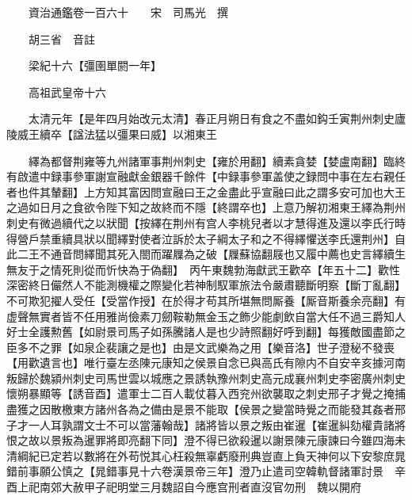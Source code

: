 










 


 
 


 

  
  
  
  
  





  
  
  
  
  
 
  

  

  
  
  



  

 
 

  
   




  

  
  


  　　資治通鑑卷一百六十　　宋　司馬光　撰

　　胡三省　音註

　　梁紀十六【彊圉單閼一年】

　　高祖武皇帝十六

　　太清元年【是年四月始改元太清】春正月朔日有食之不盡如鈎壬寅荆州刺史廬陵威王續卒【諡法猛以彊果曰威】以湘東王

　　繹為都督荆雍等九州諸軍事荆州刺史【雍於用翻】續素貪婪【婪盧南翻】臨終有啟遣中録事參軍謝宣融獻金銀器千餘件【中録事參軍盖使之録問中事在左右親任者也件其輦翻】上方知其富因問宣融曰王之金盡此乎宣融曰此之謂多安可加也大王之過如日月之食欲令陛下知之故終而不隱【終謂卒也】上意乃解初湘東王繹為荆州刺史有微過續代之以狀聞【按繹在荆州有宫人李桃兒者以才慧得進及還以李氏行時得營戶禁重續具狀以聞繹對使者泣訴於太子綱太子和之不得繹懼送李氏還荆州】自此二王不通音問繹聞其死入閤而躍屧為之破【屧蘇協翻屐也又履中薦也史言繹續生無友于之情死則從而忻快為于偽翻】　丙午東魏勃海獻武王歡卒【年五十二】歡性深密終日儼然人不能測機權之際變化若神制馭軍旅法令嚴肅聽斷明察【斷丁亂翻】不可欺犯擢人受任【受當作授】在於得才苟其所堪無問厮養【厮音斯養余亮翻】有虚聲無實者皆不任用雅尚儉素刀劒鞍勒無金玉之飾少能劇飲自當大任不過三爵知人好士全護勲舊【如尉景司馬子如孫騰諸人是也少詩照翻好呼到翻】每獲敵國盡節之臣多不之罪【如泉企裴讓之是也】由是文武樂為之用【樂音洛】世子澄秘不發喪【用歡遺言也】唯行臺左丞陳元康知之侯景自念已與高氏有隙内不自安辛亥據河南叛歸於魏潁州刺史司馬世雲以城應之景誘執豫州刺史高元成襄州刺史李密廣州刺史懷朔暴顯等【誘音酉】遣軍士二百人載仗暮入西兖州欲襲取之刺史邢子才覺之掩捕盡獲之因散檄東方諸州各為之備由是景不能取【侯景之變當時覺之而能發其姦者邢子才一人耳孰謂文士不可以當藩翰哉】諸將皆以景之叛由崔暹【崔暹糾劾權貴諸將恨之故以景叛為暹罪將即亮翻下同】澄不得已欲殺暹以謝景陳元康諫曰今雖四海未清綱紀已定若以數將在外苟悦其心枉殺無辜虧廢刑典豈直上負天神何以下安黎庶晁錯前事願公慎之【晁錯事見十六卷漢景帝三年】澄乃止遣司空韓軌督諸軍討景　辛酉上祀南郊大赦甲子祀明堂三月魏詔自今應宫刑者直沒官勿刑　魏以開府

